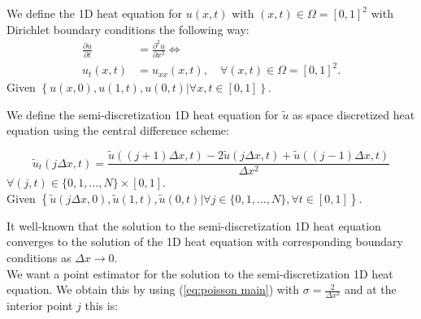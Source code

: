 \documentclass[a4paper,12pt]{article}
\begin{document}

\begin{definition} \label{def:heat equation square}
  We define the 1D heat equation for $u(x,t)$ with $ (x,t) \in \Omega = [0,1]^2$
  with Dirichlet boundary conditions the following way:
  \begin{align}
    \frac{\partial u}{\partial t} & = \frac{\partial^{2} u}{\partial x^{2}}  \Leftrightarrow   \\
    u_t(x,t)                      & = u_{xx}(x,t), \quad \forall (x,t) \in \Omega = [0,1]^2  .
  \end{align}
  Given $\left\{u(x,0),u(1,t),u(0,t) | \forall x,t \in [0,1]  \right\} $.
\end{definition}

\begin{definition} \label{def:discrete heat equation square}
  We define the semi-discretization 1D heat equation for $\tilde{u}$ as space discretized heat equation
  using the central difference scheme:

  \begin{equation}
    \tilde{u}_t(j \Delta x,t)  = \frac{\tilde{u}((j+1) \Delta x, t)-2\tilde{u}(j \Delta x, t)+\tilde{u}((j-1) \Delta x, t)}{\Delta x^{2}}
  \end{equation}
  $\forall (j,t) \in \{0, 1, \ldots, N\} \times [0,1]$. \\
  Given $\left\{\tilde{u}(j \Delta x,0),\tilde{u}(1,t),\tilde{u}(0,t) | \forall j \in \{0, 1, \ldots, N\}, \forall t \in  [0,1]  \right\} $.
\end{definition}


It well-known that the solution to the semi-discretization 1D heat equation converges to the solution of the 1D heat equation with
corresponding boundary conditions as $\Delta x \rightarrow 0$. \\
We want a point estimator for the solution to the semi-discretization 1D heat equation. We obtain this by
using (\ref{eq:poisson main}) with $\sigma = \frac{2}{\Delta x^{2}}$ and at the interior point $j$ this is:

\end{document}
